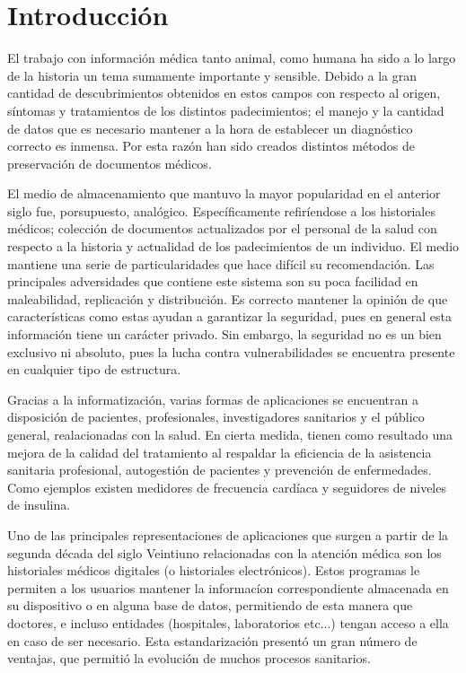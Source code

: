 
\chapter*{{ Introducción}}\label{chapter:introduction}


El trabajo con informaci\'on m\'edica tanto animal, como humana ha sido a lo largo de la historia un tema sumamente importante y sensible. Debido a la gran cantidad de descubrimientos obtenidos en estos campos con respecto al origen, s\'intomas y tratamientos de los distintos padecimientos; el manejo y la cantidad de datos que es necesario mantener a la hora de establecer un diagn\'ostico correcto es inmensa. Por esta raz\'on han sido creados distintos m\'etodos de preservaci\'on de documentos m\'edicos.

El medio de almacenamiento que mantuvo la mayor popularidad en el anterior siglo fue, porsupuesto, anal\'ogico. Espec\'ificamente refir\'iendose a los historiales m\'edicos; colecci\'on de documentos actualizados por el personal de la salud con respecto a la historia y actualidad de los padecimientos de un individuo. El medio mantiene una serie de particularidades que hace dif\'icil su recomendaci\'on. Las principales adversidades que contiene este sistema son su poca facilidad en maleabilidad, replicaci\'on y distribuci\'on. Es correcto mantener la opini\'on de que caracter\'isticas como estas ayudan a garantizar la seguridad, pues en general esta informaci\'on tiene un car\'acter privado. Sin embargo, la seguridad no es un bien exclusivo ni absoluto, pues la lucha contra vulnerabilidades se encuentra presente en cualquier tipo de estructura.

Gracias a la informatizaci\'on, varias formas de aplicaciones se encuentran a disposición de pacientes, profesionales, investigadores sanitarios y el p\'ublico general, realacionadas con la salud. En cierta medida, tienen como resultado una mejora de la calidad del tratamiento al respaldar la eficiencia de la asistencia sanitaria profesional, autogestión de pacientes y prevención de enfermedades. Como ejemplos existen medidores de frecuencia card\'iaca y seguidores de niveles de insulina.

Uno de las principales representaciones de aplicaciones que surgen a partir de la segunda d\'ecada del siglo Veintiuno relacionadas con la atenci\'on m\'edica son los historiales m\'edicos digitales (o historiales electr\'onicos). Estos programas le permiten a los usuarios mantener la informac\'ion correspondiente almacenada en su dispositivo o en alguna base de datos, permitiendo de esta manera que doctores, e incluso entidades (hospitales, laboratorios etc...) tengan acceso a ella en caso de ser necesario. Esta estandarizaci\'on present\'o un gran n\'umero de ventajas, que permiti\'o la evoluci\'on de muchos procesos sanitarios. 

